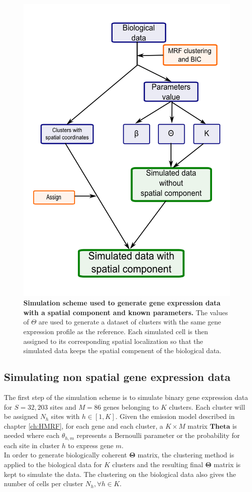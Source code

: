 	\begin{figure}[H]
\centerline{\includegraphics[width=0.6\linewidth]{gfx/chapter5/simulation_scheme.png}}
\caption{{\bf Simulation scheme used to generate gene expression data with a spatial component and known parameters.} The values of $\Theta$ are used to generate a dataset of clusters with the same gene expression profile as the reference. Each simulated cell is then assigned to its corresponding spatial localization so that the simulated data keeps the spatial compenent of the biological data.}
\label{fig:simulationScheme}
	\end{figure}
	
	\subsection{Simulating non spatial gene expression data}\label{subsec:simul_non_spatial}
	The first step of the simulation scheme is to simulate binary gene expression data for $S=32,203$ sites and $M=86$ genes belonging to $K$ clusters. Each cluster will be assigned $N_h$ sites with $h \in [1,K]$. Given the emission model described in chapter \ref{ch:HMRF}, for each gene and each cluster, a $K \times M$ matrix $\boldsymbol{Theta}$ is needed where each $\theta_{h,m}$ represents a Bernoulli parameter or the probability for each site in cluster $h$ to express gene $m$.\\
	
	In order to generate biologically coherent $\boldsymbol{\Theta}$ matrix, the clustering method is applied to the biological data for $K$ clusters and the resulting final $\boldsymbol{\Theta}$ matrix is kept to simulate the data. The clustering on the biological data also gives the number of cells per cluster $N_h, \forall h \in K$.\\
	
